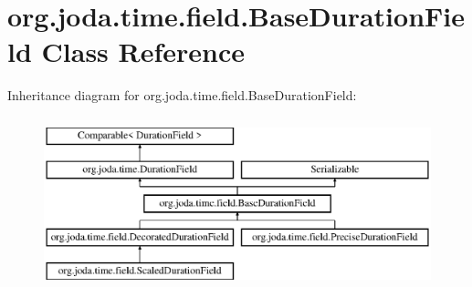\hypertarget{classorg_1_1joda_1_1time_1_1field_1_1_base_duration_field}{\section{org.\-joda.\-time.\-field.\-Base\-Duration\-Field Class Reference}
\label{classorg_1_1joda_1_1time_1_1field_1_1_base_duration_field}
}
Inheritance diagram for org.\-joda.\-time.\-field.\-Base\-Duration\-Field\-:\begin{figure}[H]
\begin{center}
\leavevmode
\includegraphics[height=5.000000cm]{classorg_1_1joda_1_1time_1_1field_1_1_base_duration_field}
\end{center}
\end{figure}
